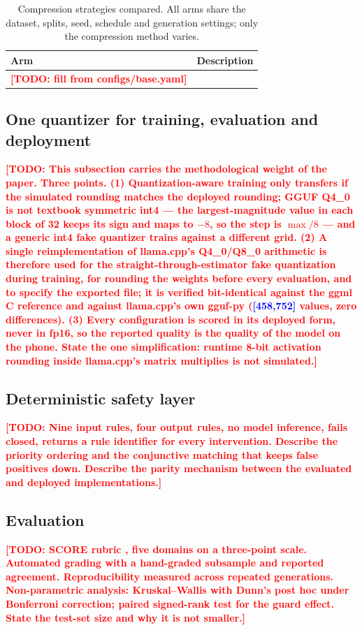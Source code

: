 \documentclass[10pt,twocolumn]{article}
\newcommand{\TODO}[1]{\textcolor{red}{\textbf{[TODO: #1]}}}
\newcommand{\NUM}[1]{\textcolor{blue}{\textbf{[#1]}}}
\begin{document}
\begin{table}[t]\centering\small
\caption{Compression strategies compared. All arms share the dataset, splits,
seed, schedule and generation settings; only the compression method varies.}
\label{tab:arms}
\begin{tabular}{ll}
\toprule
Arm & Description \\
\midrule
\TODO{fill from configs/base.yaml} & \\
\bottomrule
\end{tabular}
\end{table}

\subsection{One quantizer for training, evaluation and deployment}
\TODO{This subsection carries the methodological weight of the paper. Three
points. (1) Quantization-aware training only transfers if the simulated
rounding matches the deployed rounding; GGUF Q4\_0 is not textbook symmetric
int4 --- the largest-magnitude value in each block of 32 keeps its sign and
maps to $-8$, so the step is $\max/8$ --- and a generic int4 fake quantizer
trains against a different grid. (2) A single reimplementation of llama.cpp's
Q4\_0/Q8\_0 arithmetic is therefore used for the straight-through-estimator
fake quantization during training, for rounding the weights before every
evaluation, and to specify the exported file; it is verified bit-identical
against the ggml C reference and against llama.cpp's own gguf-py
(\NUM{458,752} values, zero differences). (3) Every configuration is scored
in its deployed form, never in fp16, so the reported quality is the quality of
the model on the phone. State the one simplification: runtime 8-bit
activation rounding inside llama.cpp's matrix multiplies is not simulated.}

\subsection{Deterministic safety layer}
\TODO{Nine input rules, four output rules, no model inference, fails closed,
returns a rule identifier for every intervention. Describe the priority
ordering and the conjunctive matching that keeps false positives down.
Describe the parity mechanism between the evaluated and deployed
implementations.}

\subsection{Evaluation}
\TODO{SCORE rubric \citep{elangovan2025medpal}, five domains on a three-point
scale. Automated grading with a hand-graded subsample and reported agreement.
Reproducibility measured across repeated generations. Non-parametric analysis:
Kruskal--Wallis with Dunn's post hoc under Bonferroni correction; paired
signed-rank test for the guard effect. State the test-set size and why it is
not smaller.}
\end{document}
